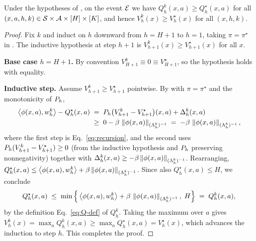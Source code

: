 \begin{lemma}[Optimism]\label{lem:optimism}
Under the hypotheses of , on the event $\mathcal{E}$ we have
$Q_h^k(x,a)\ge Q_h^\star(x,a)$ for all $(x,a,h,k)\in\mathcal{S}\times\mathcal{A}\times[H]\times
[K]$, and hence $V_h^k(x)\ge V_h^\star(x)$ for all $(x,h,k)$.
\end{lemma}

\begin{proof}
Fix $k$ and induct on $h$ downward from $h=H+1$ to $h=1$, taking $\pi=\pi^\star$
in . The inductive hypothesis at step $h+1$ is
$V_{h+1}^k(x)\ge V_{h+1}^\star(x)$ for all $x$.

\noindent\textbf{Base case $h=H+1$.} By convention $V_{H+1}^k\equiv 0\equiv
V_{H+1}^\star$, so the hypothesis holds with equality.

\noindent\textbf{Inductive step.} Assume $V_{h+1}^k\ge V_{h+1}^\star$
pointwise. By  with $\pi=\pi^\star$ and the monotonicity of
$P_h$,
\begin{align*}
\left\langle \phi(x,a), w_h^k \right\rangle - Q_h^\star(x,a)
&\;=\; P_h\big(V_{h+1}^k - V_{h+1}^\star\big)(x,a) + \Delta_h^k(x,a) \\
&\;\ge\; 0 - \beta\,\left\| \phi(x,a) \right\|_{(\Lambda_h^k)^{-1}}
\;=\; -\beta\,\left\| \phi(x,a) \right\|_{(\Lambda_h^k)^{-1}},
\end{align*}
where the first step is Eq.~\eqref{eq:recursion}, and the second uses
$P_h(V_{h+1}^k-V_{h+1}^\star)\ge0$ (from the inductive hypothesis and
$P_h$ preserving nonnegativity) together with $\Delta_h^k(x,a)\ge-\beta
\left\| \phi(x,a) \right\|_{(\Lambda_h^k)^{-1}}$. Rearranging,
$Q_h^\star(x,a)\le\left\langle \phi(x,a), w_h^k \right\rangle+\beta\left\| \phi(x,a) \right\|_{(\Lambda_h^k)^{-1}}$. Since also $Q_h^\star(x,a)\le H$, we conclude
\begin{align*}
Q_h^\star(x,a)
\;\le\; \min\Big\{ \left\langle \phi(x,a), w_h^k \right\rangle + \beta\,\left\| \phi(x,a) \right\|_{(\Lambda_h^k)^{-1}},\; H \Big\}
\;=\; Q_h^k(x,a),
\end{align*}
by the definition Eq.~\eqref{eq:Q-def} of $Q_h^k$. Taking the maximum over $a$
gives $V_h^k(x)=\max_a Q_h^k(x,a)\ge\max_a Q_h^\star(x,a)=V_h^\star(x)$, which
advances the induction to step $h$. This completes the proof.
\end{proof}
